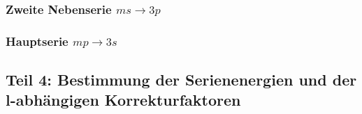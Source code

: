 \documentclass[DIV=13]{scrartcl}
\begin{document}
\subsubsection*{Zweite Nebenserie $ ms \rightarrow 3p$ }

\subsubsection*{Hauptserie $ mp \rightarrow 3s$ }

\subsection*{Teil 4: Bestimmung der Serienenergien und der l-abhängigen Korrekturfaktoren}






\end{document}
